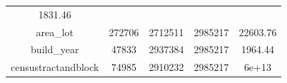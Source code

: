 \documentclass[]{book}
\theoremstyle{definition}
\theoremstyle{definition}
\theoremstyle{definition}
\theoremstyle{remark}
\begin{document}
\begin{longtable}[]{@{}ccccc@{}}
\begin{minipage}[t]{0.13\columnwidth}
1831.46\strut
\end{minipage}\tabularnewline
\begin{minipage}[t]{0.33\columnwidth}\centering\strut
area\_lot\strut
\end{minipage} & \begin{minipage}[t]{0.12\columnwidth}\centering\strut
272706\strut
\end{minipage} & \begin{minipage}[t]{0.13\columnwidth}\centering\strut
2712511\strut
\end{minipage} & \begin{minipage}[t]{0.12\columnwidth}\centering\strut
2985217\strut
\end{minipage} & \begin{minipage}[t]{0.13\columnwidth}\centering\strut
22603.76\strut
\end{minipage}\tabularnewline
\begin{minipage}[t]{0.33\columnwidth}\centering\strut
build\_year\strut
\end{minipage} & \begin{minipage}[t]{0.12\columnwidth}\centering\strut
47833\strut
\end{minipage} & \begin{minipage}[t]{0.13\columnwidth}\centering\strut
2937384\strut
\end{minipage} & \begin{minipage}[t]{0.12\columnwidth}\centering\strut
2985217\strut
\end{minipage} & \begin{minipage}[t]{0.13\columnwidth}\centering\strut
1964.44\strut
\end{minipage}\tabularnewline
\begin{minipage}[t]{0.33\columnwidth}\centering\strut
censustractandblock\strut
\end{minipage} & \begin{minipage}[t]{0.12\columnwidth}\centering\strut
74985\strut
\end{minipage} & \begin{minipage}[t]{0.13\columnwidth}\centering\strut
2910232\strut
\end{minipage} & \begin{minipage}[t]{0.12\columnwidth}\centering\strut
2985217\strut
\end{minipage} & \begin{minipage}[t]{0.13\columnwidth}\centering\strut
6e+13\strut
\end{minipage}\tabularnewline

\end{longtable}
\end{document}
